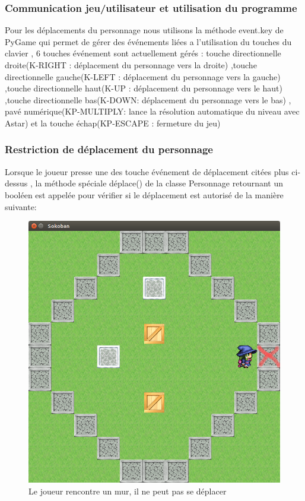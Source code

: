 \documentclass{article}
\begin{document}
		\subsubsection{Communication jeu/utilisateur et utilisation du programme}
		
			Pour les déplacements du personnage nous utilisons la méthode event.key de PyGame qui permet de gérer des événements liées a l'utilisation du touches du clavier , 6 touches événement sont actuellement gérés : touche directionnelle droite(K-RIGHT : déplacement du personnage vers la droite) ,touche directionnelle gauche(K-LEFT : déplacement du personnage vers la gauche) ,touche directionnelle haut(K-UP : déplacement du personnage vers le haut) ,touche directionnelle bas(K-DOWN: déplacement du personnage vers le bas) ,   pavé numérique(KP-MULTIPLY: lance la résolution automatique du niveau avec Astar) et la touche échap(KP-ESCAPE : fermeture du jeu)
		\subsubsection{Restriction de déplacement du personnage}		
		Lorsque le joueur presse une des touche événement de déplacement citées plus ci-dessus , la méthode spéciale déplace() de la classe Personnage retournant un booléen est appelée pour vérifier si le déplacement est autorisé de la manière suivante:
\begin{figure}[!h]
\centering
\includegraphics[scale=0.25]{img/01.png}
\caption{Le joueur rencontre un mur, il ne peut pas se déplacer}			
\end{figure}
\end{document}
